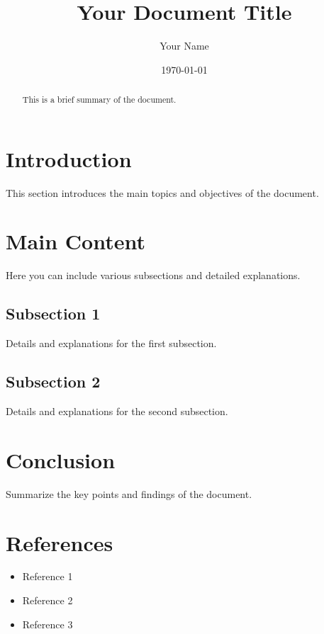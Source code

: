 \documentclass{article}
\title{Your Document Title}
\author{Your Name}
\date{\today}
\begin{document}
\maketitle

\begin{abstract}
This is a brief summary of the document.
\end{abstract}

\section{Introduction}
This section introduces the main topics and objectives of the document.

\section{Main Content}
Here you can include various subsections and detailed explanations.

\subsection{Subsection 1}
Details and explanations for the first subsection.

\subsection{Subsection 2}
Details and explanations for the second subsection.

\section{Conclusion}
Summarize the key points and findings of the document.

\section*{References}
\begin{itemize}
    \item Reference 1
    \item Reference 2
    \item Reference 3
\end{itemize}
\end{document}
